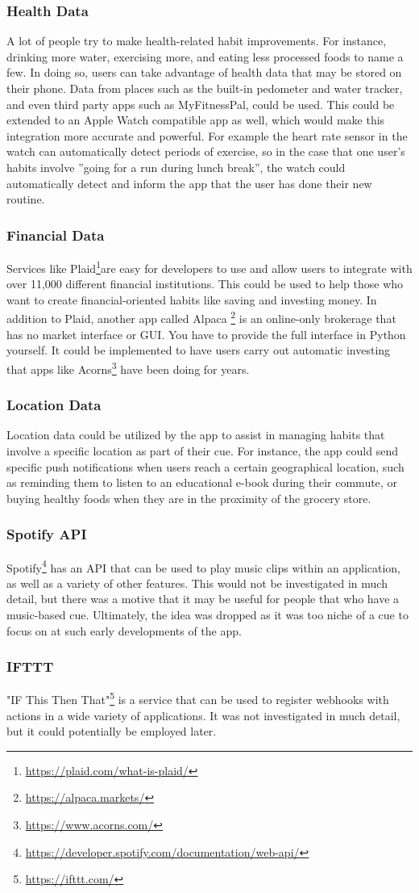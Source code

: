 \subsubsection{Health Data}
A lot of people try to make health-related habit improvements. For instance, drinking more water, exercising more, and eating less processed foods to name a few. In doing so, users can take advantage of health data that may be stored on their phone. Data from places such as the built-in pedometer and water tracker, and even third party apps such as MyFitnessPal, could be used. This could be extended to an Apple Watch compatible app as well, which would make this integration more accurate and powerful. For example the heart rate sensor in the watch can automatically detect periods of exercise, so in the case that one user’s habits involve ”going for a run during lunch break”, the watch could automatically detect and inform the app that the user has done their new routine.
\subsubsection{Financial Data}
Services like Plaid\footnote{\url{https://plaid.com/what-is-plaid/}}are easy for developers to use and allow users to integrate with over 11,000 different financial institutions. This could be used to help those who want to create financial-oriented habits like saving and investing money. In addition to Plaid, another app called Alpaca \footnote{\url{https://alpaca.markets/}} is an online-only brokerage that has no market interface or GUI. You have to provide the full interface in Python yourself. It could be implemented to have users carry out automatic investing that apps like Acorns\footnote{\url{https://www.acorns.com/}} have been doing for years.
\subsubsection{Location Data}
Location data could be utilized by the app to assist in managing habits that involve a specific location as part of their cue. For instance, the app could send specific push notifications when users reach a certain geographical location, such as reminding them to listen to an educational e-book during their commute, or buying healthy foods when they are in the proximity of the grocery store.

\subsubsection{Spotify API}
Spotify\footnote{\url{https://developer.spotify.com/documentation/web-api/}} has an API that can be used to play music clips within an application, as well as a variety of other features. This would not be investigated in much detail, but there was a motive that it may be useful for people that who have a music-based cue. Ultimately, the idea was dropped as it was too niche of a cue to focus on at such early developments of the app.
\subsubsection{IFTTT}
"IF This Then That"\footnote{\url{https://ifttt.com/}} is a service that can be used to register webhooks with actions in a wide variety of applications. It was not investigated in much detail, but it could potentially be employed later.